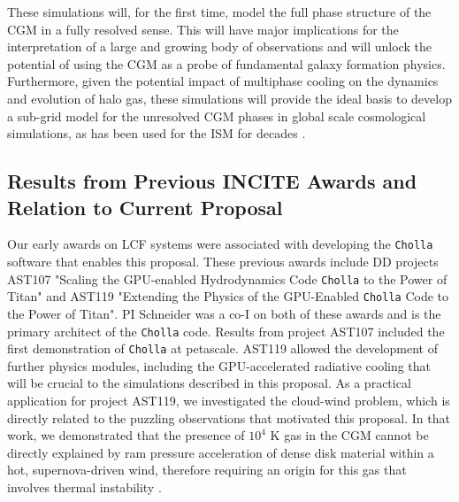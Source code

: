 \documentclass[11pt,letterpaper,english]{article}
\begin{document}
These simulations will, for the first time, model the full phase structure of the CGM in a fully resolved sense. This will have major implications for the interpretation of a large and growing body of observations and will unlock the potential of using the CGM as a probe of fundamental galaxy formation physics. Furthermore, given the potential impact of multiphase cooling on the dynamics and evolution of halo gas, these simulations will provide the ideal basis to develop a sub-grid model for the unresolved CGM phases in global scale cosmological simulations, as has been used for the ISM for decades \cite{SpringelHernquist}.




\vspace{-.25in}
\subsection{Results from Previous INCITE Awards and Relation to Current Proposal}
\vspace{-.2in}


Our early awards on LCF systems were associated with developing the {\tt Cholla} software that enables this proposal. These previous awards include DD projects AST107 "Scaling the GPU-enabled Hydrodynamics Code {\tt Cholla} to the Power of Titan" and AST119 "Extending the Physics of the GPU-Enabled {\tt Cholla} Code to the Power of Titan". PI Schneider was a co-I on both of these awards and is the primary architect of the {\tt Cholla} code. Results from project AST107 included the first demonstration of {\tt Cholla} at petascale. AST119 allowed the development of further physics modules, including the GPU-accelerated radiative cooling that will be crucial to the simulations described in this proposal. As a practical application for project AST119, we investigated the cloud-wind problem, which is directly related to the puzzling observations that motivated this proposal. In that work, we demonstrated that the presence of $10^4$ K gas in the CGM cannot be directly explained by ram pressure acceleration of dense disk material within a hot, supernova-driven wind, therefore requiring an origin for this gas that involves thermal instability \cite{Schneider17}.
\end{document}
